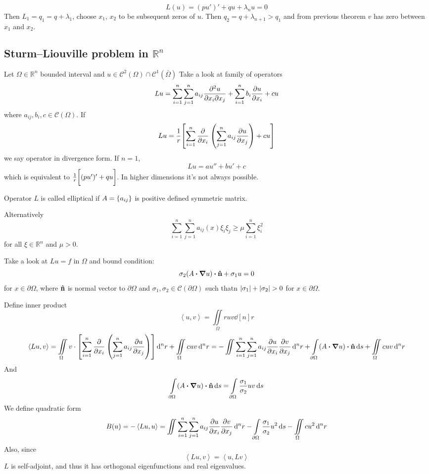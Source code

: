 $$L(u) = (pu')'+qu+\lambda_nu  =0 $$
Then $L_1  =q_1= q +\lambda_1$, choose $x_1$, $x_2$ to be subsequent zeros of $u$. Then $q_2 = q+\lambda_{n+1} > q_1$ and from previous theorem $v$ has zero between $x_1$ and $x_2$.

\subsection{Sturm–Liouville problem in $\mathbb{R}^n$}
Let $\Omega \in \mathbb{R}^n$ bounded interval and
$u \in \mathcal{C}^2(\Omega) \cap \mathcal{C}^1(\bar{ \Omega})$
Take a look at family of operators
$$Lu = \sum_{i=1}^n \sum_{j=1}^n a_{ij} \pdv{u}{x_i}{x_j} + \sum_{i=1}^n b_i \pdv{u}{x_i} +cu$$
where $a_{ij}, b_i, c \in \mathcal{C}(\Omega)$.
If 
$$Lu = \frac{1}{r} \qty[\sum_{i=1}^n \pdv{x_i}\:\qty(\sum_{j=1}^n a_{ij} \pdv{u}{x_j}) + cu]$$
we say operator in divergence form. 
If $n=1$, 
$$Lu = au'' +bu'+c$$
which is equivalent to $\frac{1}{r}\qty\bigg[(pu')'+qu]$. In higher dimensions it's not always possible.


Operator $L$ is called elliptical if $A = \qty{a_{ij}}$ is positive defined symmetric matrix.

Alternatively
$$\sum_{i=1}^n \sum_{j=1}^n a_{ij}(x) \xi_i \xi_j \geq \mu \sum_{i=1}^n \xi_i^2$$ 
for all $\xi \in \mathbb{R}^n$ and $\mu>0$.

Take a look at $Lu = f$ in $\Omega$ and bound condition:
$$\sigma_2 (A \vdot \grad{u}) \vdot \vu{n} + \sigma_1 u = 0$$
for $x\in \partial \Omega$, where $\vu{n}$ is normal vector to $\partial \Omega$ and $\sigma_1, \sigma_2 \in \mathcal{C}(\partial \Omega)$ such thatn $\abs{ \sigma_1}+\abs{ \sigma_2}>0$ for $x\in \partial \Omega$.

Define inner product 
$$\left\langle u,v \right\rangle = \iint\limits_{\Omega} ruv \dd[n]{r}$$
$$\left\langle Lu,v \right\rangle = \iint\limits_{\Omega}v \cdot \qty[\sum_{i=1}^n \pdv{x_i}\:\qty(\sum_{j=1}^n a_{ij} \pdv{u}{x_j})] \dd[n]{r} +\iint\limits_{\Omega} cuv\dd[n]{r} = -\iint \sum_{i=1}^n \sum_{j=1}^n a_{ij} \pdv{u}{x_i} \pdv{v}{x_j} \dd[n]{r} + \int\limits_{\partial \Omega}   (A \vdot \grad{u}) \vdot \vu{n} \dd{s} +\iint\limits_{\Omega} cuv\dd[n]{r} $$
And
$$ \int\limits_{\partial \Omega}   (A \vdot \grad{u}) \vdot \vu{n} \dd{s} = \int\limits_{\partial \Omega}   \frac{\sigma_1}{\sigma_2}uv \dd{s}  $$
We define quadratic form
$$B(u) = -\left\langle Lu,u \right\rangle = \iint \sum_{i=1}^n \sum_{j=1}^n a_{ij} \pdv{u}{x_i} \pdv{v}{x_j} \dd[n]{r} - \int\limits_{\partial \Omega}   \frac{\sigma_1}{\sigma_2}u^2 \dd{s} - \iint\limits_{\Omega} cu^2 \dd[n]{r} $$
Also, since
$$\left\langle Lu,v \right\rangle = \left\langle u,Lv \right\rangle$$
$L$ is self-adjoint, and thus it has orthogonal eigenfunctions and real eigenvalues.
